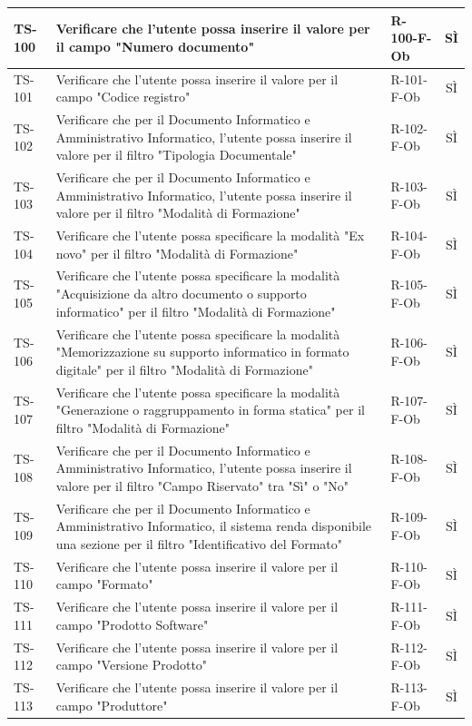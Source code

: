 \documentclass[a4paper,12pt]{article}
\begin{document}
\begin{longtable}{|p{1.5cm}|p{8.3cm}|p{2.4cm}|c|}
\hline
TS-100 & Verificare che l'utente possa inserire il valore per il campo "Numero documento" & R-100-F-Ob & SÌ \\
\hline
TS-101 & Verificare che l'utente possa inserire il valore per il campo "Codice registro" & R-101-F-Ob & SÌ \\
\hline
TS-102 & Verificare che per il Documento Informatico e Amministrativo Informatico, l'utente possa inserire il valore per il filtro "Tipologia Documentale" & R-102-F-Ob & SÌ \\
\hline
TS-103 & Verificare che per il Documento Informatico e Amministrativo Informatico, l'utente possa inserire il valore per il filtro "Modalità di Formazione" & R-103-F-Ob & SÌ \\
\hline
TS-104 & Verificare che l'utente possa specificare la modalità "Ex novo" per il filtro "Modalità di Formazione" & R-104-F-Ob & SÌ \\
\hline
TS-105 & Verificare che l'utente possa specificare la modalità "Acquisizione da altro documento o supporto informatico" per il filtro "Modalità di Formazione" & R-105-F-Ob & SÌ \\
\hline
TS-106 & Verificare che l'utente possa specificare la modalità "Memorizzazione su supporto informatico in formato digitale" per il filtro "Modalità di Formazione" & R-106-F-Ob & SÌ \\
\hline
TS-107 & Verificare che l'utente possa specificare la modalità "Generazione o raggruppamento in forma statica" per il filtro "Modalità di Formazione" & R-107-F-Ob & SÌ \\
\hline
TS-108 & Verificare che per il Documento Informatico e Amministrativo Informatico, l'utente possa inserire il valore per il filtro "Campo Riservato" tra "Sì" o "No" & R-108-F-Ob & SÌ \\
\hline
TS-109 & Verificare che per il Documento Informatico e Amministrativo Informatico, il sistema renda disponibile una sezione per il filtro "Identificativo del Formato" & R-109-F-Ob & SÌ \\
\hline
TS-110 & Verificare che l'utente possa inserire il valore per il campo "Formato" & R-110-F-Ob & SÌ \\
\hline
TS-111 & Verificare che l'utente possa inserire il valore per il campo "Prodotto Software" & R-111-F-Ob & SÌ \\
\hline
TS-112 & Verificare che l'utente possa inserire il valore per il campo "Versione Prodotto" & R-112-F-Ob & SÌ \\
\hline
TS-113 & Verificare che l'utente possa inserire il valore per il campo "Produttore" & R-113-F-Ob & SÌ \\

\end{longtable}
\end{document}

